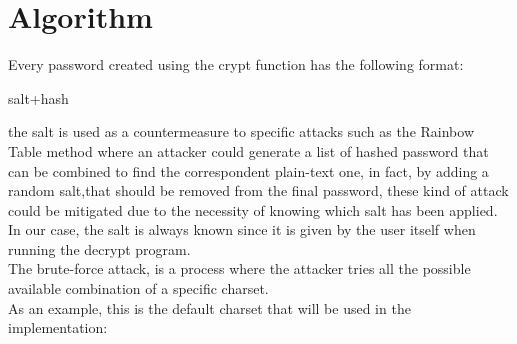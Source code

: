 \documentclass[10pt,twocolumn,letterpaper]{article}
\newenvironment{Shaded}{}{}
\newcommand{\ExtensionTok}[1]{#1}
\begin{document}
\vspace{3cm}

\section{Algorithm}

Every password created using the crypt function has the following format:\\
\begin{Shaded}
\begin{Highlighting}[]
\ExtensionTok{salt+hash}
\end{Highlighting}
\end{Shaded}
the salt is used as a countermeasure to specific attacks such as the Rainbow Table method where an attacker could generate a list of 
hashed password that can be combined to find the correspondent plain-text one, in fact, by adding a random salt,that should be removed 
from the final password, these kind of attack could be mitigated due to the necessity of knowing which salt has been applied.\\
In our case, the salt is always known since it is given by the user itself when running the decrypt program.\\
The brute-force attack, is a process where the attacker tries all the possible available combination of a specific charset.\\
As an example, this is the default charset that will be used in the implementation:\\
\end{document}
